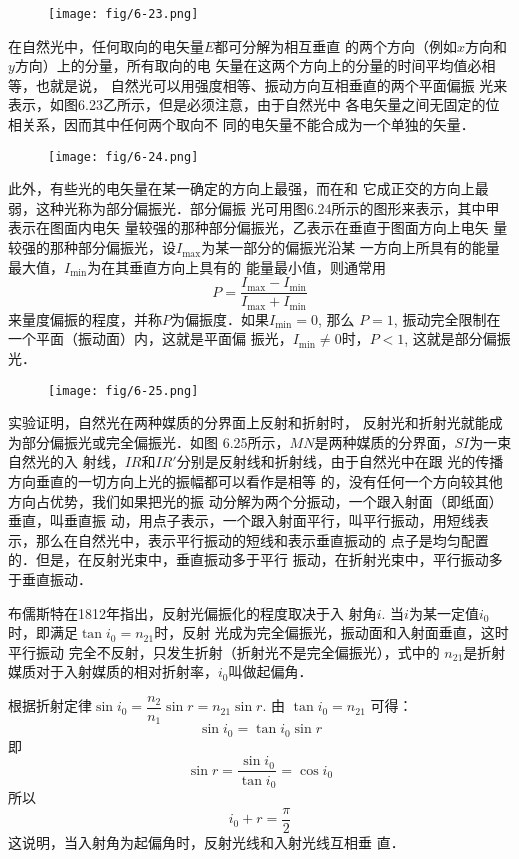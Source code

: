 \begin{figure}[htp]
    \centering
     \texttt{[image: fig/6-23.png]}
    \caption{}
\end{figure}

在自然光中，任何取向的电矢量$E$都可分解为相互垂直
的两个方向（例如$x$方向和$y$方向）上的分量，所有取向的电
矢量在这两个方向上的分量的时间平均值必相等，也就是说，
自然光可以用强度相等、振动方向互相垂直的两个平面偏振
光来表示，如图6.23乙所示，但是必须注意，由于自然光中
各电矢量之间无固定的位相关系，因而其中任何两个取向不
同的电矢量不能合成为一个单独的矢量．


\begin{figure}[htp]
    \centering
     \texttt{[image: fig/6-24.png]}
    \caption{}
\end{figure}

此外，有些光的电矢量在某一确定的方向上最强，而在和
它成正交的方向上最弱，这种光称为部分偏振光．部分偏振
光可用图6.24所示的图形来表示，其中甲表示在图面内电矢
量较强的那种部分偏振光，乙表示在垂直于图面方向上电矢
量较强的那种部分偏振光，设$I_{\max}$为某一部分的偏振光沿某
一方向上所具有的能量最大值，$I_{\min}$为在其垂直方向上具有的
能量最小值，则通常用
\[P=\frac{I_{\max}-I_{\min}}{I_{\max}+I_{\min}}\]
来量度偏振的程度，并称$P$为偏振度．如果$I_{\min}=0$, 那么
$P=1$, 振动完全限制在一个平面（振动面）内，这就是平面偏
振光，$I_{\min}\ne 0$时，$P<1$, 这就是部分偏振光．

\begin{figure}[htp]
    \centering
     \texttt{[image: fig/6-25.png]}
    \caption{}
\end{figure}

实验证明，自然光在两种媒质的分界面上反射和折射时，
反射光和折射光就能成为部分偏振光或完全偏振光．如图
6.25所示，$MN$是两种媒质的分界面，$SI$为一束自然光的入
射线，$IR$和$IR'$分别是反射线和折射线，由于自然光中在跟
光的传播方向垂直的一切方向上光的振幅都可以看作是相等
的，没有任何一个方向较其他方向占优势，我们如果把光的振
动分解为两个分振动，一个跟入射面（即纸面）垂直，叫垂直振
动，用点子表示，一个跟入射面平行，叫平行振动，用短线表
示，那么在自然光中，表示平行振动的短线和表示垂直振动的
点子是均匀配置的．但是，在反射光束中，垂直振动多于平行
振动，在折射光束中，平行振动多于垂直振动．

布儒斯特在1812年指出，反射光偏振化的程度取决于入
射角$i$. 当$i$为某一定值$i_0$时，即满足$\tan i_0=n_{21}$时，反射
光成为完全偏振光，振动面和入射面垂直，这时平行振动
完全不反射，只发生折射（折射光不是完全偏振光），式中的
$n_{21}$是折射媒质对于入射媒质的相对折射率，$i_0$叫做起偏角．

根据折射定律$\sin i_0=\dfrac{n_2}{n_1}\sin r=n_{21}\sin r$. 由
$\tan i_0=n_{21}$
可得：
\[\sin i_0=\tan i_0\sin r\]
即
\[\sin r=\frac{\sin i_0}{\tan i_0}=\cos i_0\]
所以
\[i_0+r=\frac{\pi}{2}\]
这说明，当入射角为起偏角时，反射光线和入射光线互相垂
直．
